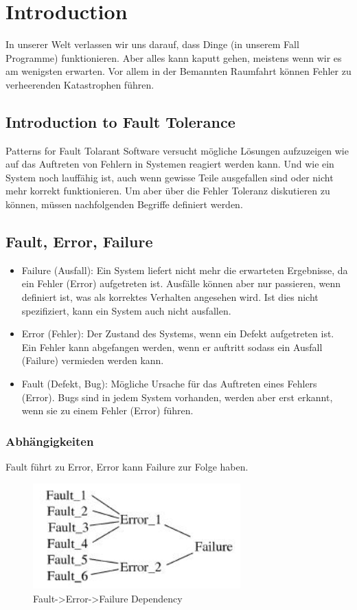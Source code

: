 \section{Introduction}
In unserer Welt verlassen wir uns darauf, dass Dinge (in unserem Fall Programme) funktionieren. Aber alles kann kaputt gehen, meistens wenn wir es am wenigsten erwarten. Vor allem in der Bemannten Raumfahrt können Fehler zu verheerenden Katastrophen führen.

\subsection*{Introduction to Fault Tolerance}
Patterns for Fault Tolarant Software versucht mögliche Lösungen aufzuzeigen wie auf das Auftreten von Fehlern in Systemen reagiert werden kann. Und wie ein System noch lauffähig ist, auch wenn gewisse Teile ausgefallen sind oder nicht mehr korrekt funktionieren. Um aber über die Fehler Toleranz diskutieren zu können, müssen nachfolgenden Begriffe definiert werden.

\subsection*{Fault, Error, Failure}
\begin{itemize}
	\item Failure (Ausfall): Ein System liefert nicht mehr die erwarteten Ergebnisse, da ein Fehler (Error) aufgetreten ist. Ausfälle können aber nur passieren, wenn definiert ist, was als korrektes Verhalten angesehen wird. Ist dies nicht spezifiziert, kann ein System auch nicht ausfallen.
	\item Error (Fehler): Der Zustand des Systems, wenn ein Defekt aufgetreten ist. Ein Fehler kann abgefangen werden, wenn er auftritt sodass ein Ausfall (Failure) vermieden werden kann.
	\item Fault (Defekt, Bug): Mögliche Ursache für das Auftreten eines Fehlers (Error). Bugs sind in jedem System vorhanden, werden aber erst erkannt, wenn sie zu einem Fehler (Error) führen.
\end{itemize}

\subsubsection*{Abhängigkeiten}
 Fault führt zu Error, Error kann Failure zur Folge haben.

\begin{figure}[H]
	\centering
	\includegraphics[width=8cm]{content/faulttolerance/images/fault-error-failure-dependency.jpg}
	\caption{Fault->Error->Failure Dependency}
\end{figure}

